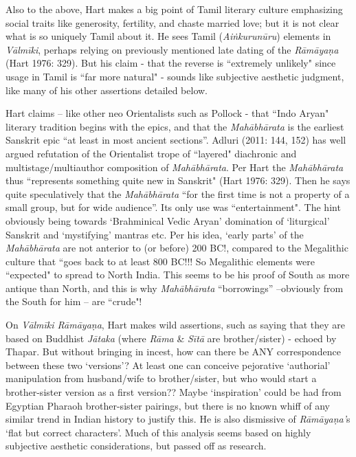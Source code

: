 Also to the above, Hart makes a big point of Tamil literary culture emphasizing social traits like generosity, fertility, and chaste married love; but it is not clear what is so uniquely Tamil about it. He sees Tamil (\textit{Aiṅkurunūru}) elements in \textit{Vālmīki}, perhaps relying on previously mentioned late dating of the \textit{Rāmāyaṇa} (Hart 1976: 329). But his claim - that the reverse is “extremely unlikely" since usage in Tamil is “far more natural" - sounds like subjective aesthetic judgment, like many of his other assertions detailed below.

Hart claims – like other neo Orientalists such as Pollock - that “Indo Aryan" literary tradition begins with the epics, and that the \textit{Mahābhārata} is the earliest Sanskrit epic “at least in most ancient sections”. Adluri (2011: 144, 152) has well argued refutation of the Orientalist trope of “layered" diachronic and multistage/multiauthor composition of \textit{Mahābhārata}. Per Hart the \textit{Mahābhārata} thus “represents something quite new in Sanskrit" (Hart 1976: 329). Then he says quite speculatively that the \textit{Mahābhārata } “for the first time is not a property of a small group, but for wide audience”. Its only use was “entertainment". The hint obviously being towards ‘Brahminical Vedic Aryan’ domination of ‘liturgical’ Sanskrit and ‘mystifying’ mantras etc. Per his idea, ‘early parts’ of the \textit{Mahābhārata } are not anterior to (or before) 200 BC!, compared to the Megalithic culture that “goes back to at least 800 BC!!! So Megalithic elements were “expected" to spread to North India. This seems to be his proof of South as more antique than North, and this is why \textit{Mahābhārata } “borrowings” –obviously from the South for him – are “crude"!

On \textit{Vālmīki Rāmāyaṇa}, Hart makes wild assertions, such as saying that they are based on Buddhist \textit{Jātaka } (where \textit{Rāma} \& \textit{Sītā } are brother/sister) - echoed by Thapar. But without bringing in incest, how can there be ANY correspondence between these two ‘versions’? At least one can conceive pejorative ‘authorial’ manipulation from husband/wife to brother/sister, but who would start a brother-sister version as a first version?? Maybe ‘inspiration’ could be had from Egyptian Pharaoh brother-sister pairings, but there is no known whiff of any similar trend in Indian history to justify this. He is also dismissive of \textit{Rāmāyaṇa’}s ‘flat but correct characters’. Much of this analysis seems based on highly subjective aesthetic considerations, but passed off as research.

